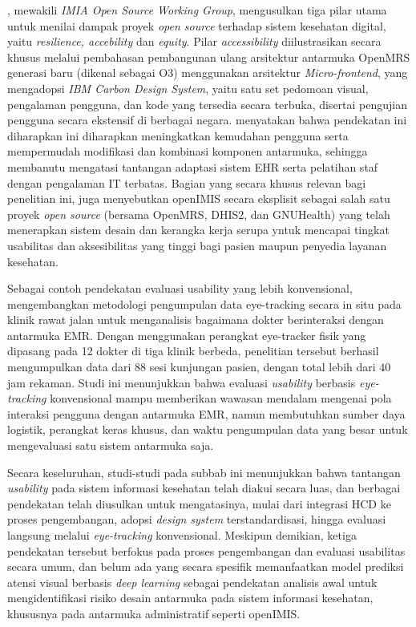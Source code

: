 \citet{paton2022open}, mewakili \textit{IMIA Open Source Working Group}, mengusulkan tiga pilar utama untuk menilai dampak proyek \textit{open source} terhadap sistem kesehatan digital, yaitu \textit{resilience, accebility} dan \textit{equity}. Pilar \textit{accessibility} diilustrasikan secara khusus melalui pembahasan pembangunan ulang arsitektur antarmuka OpenMRS generasi baru (dikenal sebagai O3) menggunakan arsitektur \textit{Micro-frontend}, yang mengadopsi \textit{IBM Carbon Design System}, yaitu satu set pedomoan visual, pengalaman pengguna, dan kode yang tersedia secara terbuka, disertai pengujian pengguna secara ekstensif di berbagai negara. \citet{paton2022open} menyatakan bahwa pendekatan ini diharapkan ini diharapkan meningkatkan kemudahan pengguna serta mempermudah modifikasi dan kombinasi komponen antarmuka, sehingga membanutu mengatasi tantangan adaptasi sistem EHR serta pelatihan staf dengan pengalaman IT terbatas. Bagian yang secara khusus relevan bagi penelitian ini, \citet{paton2022open} juga menyebutkan openIMIS secara eksplisit sebagai salah satu proyek \textit{open source} (bersama OpenMRS, DHIS2, dan GNUHealth) yang telah menerapkan sistem desain dan kerangka kerja serupa yntuk mencapai tingkat usabilitas dan aksesibilitas yang tinggi bagi pasien maupun penyedia layanan kesehatan.

Sebagai contoh pendekatan evaluasi usability yang lebih konvensional, \citet{rick2015eyes} mengembangkan metodologi pengumpulan data eye-tracking secara in situ pada klinik rawat jalan untuk menganalisis bagaimana dokter berinteraksi dengan antarmuka EMR. Dengan menggunakan perangkat eye-tracker fisik yang dipasang pada 12 dokter di tiga klinik berbeda, penelitian tersebut berhasil mengumpulkan data dari 88 sesi kunjungan pasien, dengan total lebih dari 40 jam rekaman. Studi ini menunjukkan bahwa evaluasi \textit{usability} berbasis \textit{eye-tracking} konvensional mampu memberikan wawasan mendalam mengenai pola interaksi pengguna dengan antarmuka EMR, namun membutuhkan sumber daya logistik, perangkat keras khusus, dan waktu pengumpulan data yang besar untuk mengevaluasi satu sistem antarmuka saja.

Secara keseluruhan, studi-studi pada subbab ini menunjukkan bahwa tantangan \textit{usability} pada sistem informasi kesehatan telah diakui secara luas, dan berbagai pendekatan telah diusulkan untuk mengatasinya, mulai dari integrasi HCD ke proses pengembangan, adopsi \textit{design system} terstandardisasi, hingga evaluasi langsung melalui \textit{eye-tracking} konvensional. Meskipun demikian, ketiga pendekatan tersebut berfokus pada proses pengembangan dan evaluasi usabilitas secara umum, dan belum ada yang secara spesifik memanfaatkan model prediksi atensi visual berbasis \textit{deep learning} sebagai pendekatan analisis awal untuk mengidentifikasi risiko desain antarmuka pada sistem informasi kesehatan, khususnya pada antarmuka administratif seperti openIMIS.

